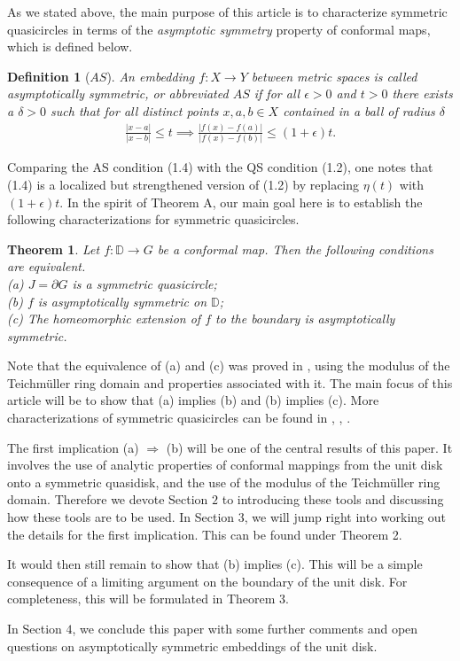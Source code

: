 \documentclass[11pt]{amsart}
\numberwithin{equation}{section}
\theoremstyle{plain}
\newtheorem{definition}{Definition}
\newtheorem{thm}{Theorem}
\theoremstyle{step}
\def\leq{\leqslant}
\newcommand{\abs}[1]{\lvert#1\rvert}
\newcommand{\D}{\mathbb{D}}
\begin{document}
As we stated above, the main purpose of this article is to characterize symmetric quasicircles in terms of the \textit{asymptotic symmetry} property of conformal maps, which is defined below. 
\begin{definition}[$AS$]
    An embedding $f\colon X\to Y$ between metric spaces is called asymptotically symmetric, or abbreviated $AS$ if for all $\epsilon>0$ and $t>0$ there exists a $\delta>0$ such that for all distinct points $x,a,b\in X$ contained in a ball of radius $\delta$
    \begin{align}\label{AS:property}
        \frac{\abs{x-a}}{\abs{x-b}}\leq t\implies \frac{\abs{f(x)-f(a)}}{\abs{f(x)-f(b)}}\leq (1+\epsilon)t.
    \end{align}
\end{definition}
Comparing the AS condition (1.4) with the QS condition (1.2), one notes that (1.4) is a localized but strengthened version of (1.2) by replacing $\eta(t)$ with $(1+\epsilon)t$. 
In the spirit of Theorem A, our main goal here is to establish the following characterizations for symmetric quasicircles. 
\begin{thm}\label{thm:main_theorem}
Let $f: \D\rightarrow G$ be a conformal map. Then the following conditions are equivalent.\\
(a) $J=\partial G$ is a symmetric quasicircle;\\
(b) $f$ is asymptotically symmetric on $\D$;\\
(c) The homeomorphic extension of $f$ to the boundary is asymptotically symmetric.
\end{thm}
Note that the equivalence of (a) and (c) was proved in \cite{brania2004asymptotically}, using the modulus of the Teichm\"uller ring domain and properties associated with it. The main focus of this article will be to show that (a) implies (b) and (b) implies (c). More characterizations of symmetric quasicircles can be found in \cite{MR3771265}, \cite{MR1314950},   \cite{wu2000symmetric}.\par
The first implication (a) $\Rightarrow$ (b) will be one of the central results of this paper. It involves the use of analytic properties of conformal mappings from the unit disk onto a symmetric quasidisk, and the use of the modulus of the Teichm\"uller ring domain. Therefore we devote Section $2$ to introducing these tools and discussing how these tools are to be used. In Section $3$, we will jump right into working out the details for the first implication. This can be found under Theorem 2. \par
It would then still remain to show that (b) implies (c). This will be a simple consequence of a limiting argument on the boundary of the unit disk. For completeness, this will be formulated in Theorem 3.\par
In Section $4$, we conclude this paper with some further comments and open questions on asymptotically symmetric embeddings of the unit disk. 
\end{document}
